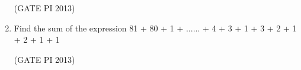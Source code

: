 \documentclass[journal,12pt,onecolumn]{IEEEtran}
\theoremstyle{remark}
\begin{document}
\begin{enumerate}
\hfill (GATE PI 2013)

\item Find the sum of the expression  
81 + 80 + 1 + ...... + 4 + 3 + 1 + 3 + 2 + 1 + 2 + 1 + 1
\begin{enumerate}
\end{enumerate}
\hfill (GATE PI 2013)
\end{enumerate}
\end{document}

